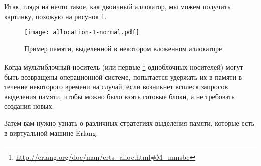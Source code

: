 Итак, глядя на нечто такое, как двоичный аллокатор, мы можем получить картинку, похожую на рисунок \ref{fig:allocation-1-normal}.

\begin{figure}
  \texttt{[image: allocation-1-normal.pdf]}%
	\caption{Пример памяти, выделенной в некотором вложенном аллокаторе}
   \label{fig:allocation-1-normal}
\end{figure}
\FloatBarrier

Когда мультиблочный носитель (или первые \footnote{\href{http://erlang.org/doc/man/erts\_alloc.html\#M\_mmsbc}{http://erlang.org/doc/man/erts\_alloc.html\#M\_mmsbc}} одноблочных носителей) могут быть возвращены операционной системе,  попытается удержать их в памяти в течение некоторого времени на случай, если возникнет всплеск запросов выделения памяти, чтобы можно было взять готовые блоки, а не требовать создания новых.

Затем вам нужно узнать о различных стратегиях выделения памяти, которые есть в виртуальной машине Erlang:

